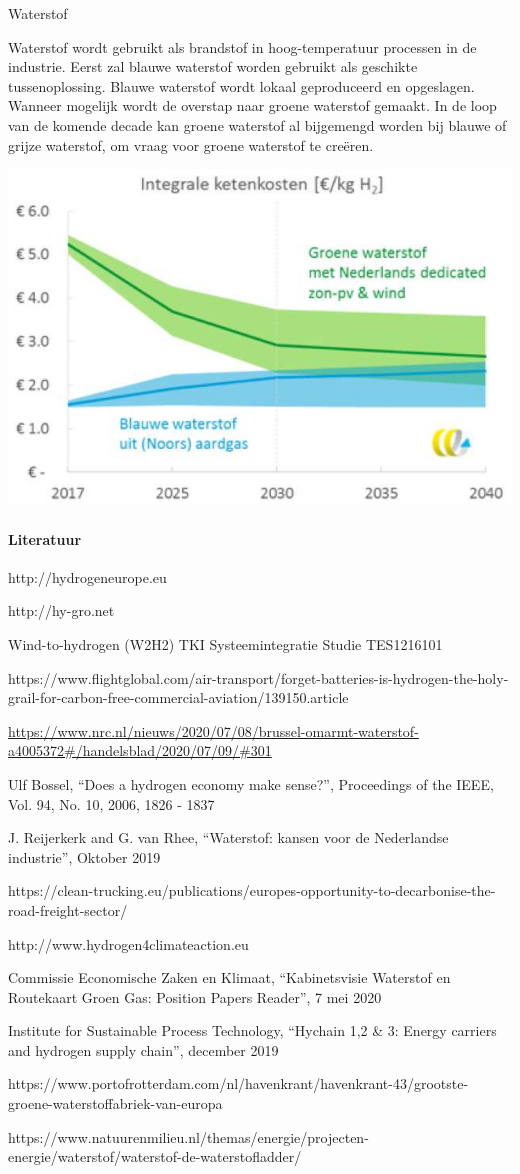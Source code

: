 \begin{voorstel}{Waterstof}
\begin{multicols*}{2}
\begin{aanbevelingen}
Waterstof wordt gebruikt als brandstof in hoog-temperatuur processen in de industrie. Eerst zal blauwe waterstof worden gebruikt als geschikte tussenoplossing. Blauwe waterstof wordt lokaal geproduceerd en opgeslagen. Wanneer mogelijk wordt de overstap naar groene waterstof gemaakt. In de loop van de komende decade kan groene waterstof al bijgemengd worden bij blauwe of grijze waterstof, om vraag voor groene waterstof te creëren.

\includegraphics[width=.5\textwidth]{img/energie/waterstof-ketenkosten}

\end{aanbevelingen}

\paragraph{Literatuur}
http://hydrogeneurope.eu

http://hy-gro.net

Wind-to-hydrogen (W2H2) TKI Systeemintegratie Studie TES1216101

https://www.flightglobal.com/air-transport/forget-batteries-is-hydrogen-the-holy-grail-for-carbon-free-commercial-aviation/139150.article

\url{https://www.nrc.nl/nieuws/2020/07/08/brussel-omarmt-waterstof-a4005372#/handelsblad/2020/07/09/#301}

Ulf Bossel, “Does a hydrogen economy make sense?”, Proceedings of the IEEE, Vol. 94, No. 10, 2006, 1826 - 1837

J. Reijerkerk and G. van Rhee, “Waterstof: kansen voor de Nederlandse industrie”, Oktober 2019

https://clean-trucking.eu/publications/europes-opportunity-to-decarbonise-the-road-freight-sector/

http://www.hydrogen4climateaction.eu

Commissie Economische Zaken en Klimaat, “Kabinetsvisie Waterstof en Routekaart Groen Gas: Position Papers Reader”, 7 mei 2020

Institute for Sustainable Process Technology, “Hychain 1,2 \& 3: Energy carriers and hydrogen supply chain”, december 2019

https://www.portofrotterdam.com/nl/havenkrant/havenkrant-43/grootste-groene-waterstoffabriek-van-europa

https://www.natuurenmilieu.nl/themas/energie/projecten-energie/waterstof/waterstof-de-waterstofladder/

\end{multicols*}

\end{voorstel}
